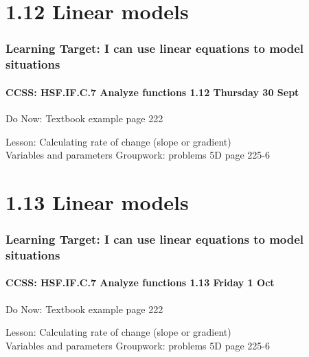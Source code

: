 \documentclass{beamer}
\begin{document}
  \section{1.12 Linear models}
  \frame
  {
    \frametitle{Learning Target: I can use linear equations to model situations}
    \framesubtitle{CCSS: HSF.IF.C.7 Analyze functions \hfill \alert{1.12 Thursday 30 Sept}}

    \begin{block}{Do Now: Textbook example page 222}
    \end{block}\vspace{0.5cm}
    Lesson: Calculating rate of change (slope or gradient)\\[0.25cm]
    Variables and parameters
    Groupwork: problems 5D page 225-6
  }


  \section{1.13 Linear models}
  \frame
  {
    \frametitle{Learning Target: I can use linear equations to model situations}
    \framesubtitle{CCSS: HSF.IF.C.7 Analyze functions \hfill \alert{1.13 Friday 1 Oct}}

    \begin{block}{Do Now: Textbook example page 222}
    \end{block}\vspace{0.5cm}
    Lesson: Calculating rate of change (slope or gradient)\\[0.25cm]
    Variables and parameters
    Groupwork: problems 5D page 225-6
  }
\end{document}
